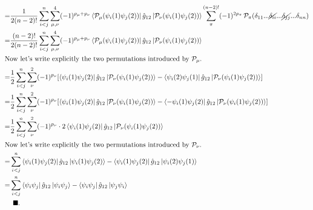 \documentclass{article}
\newcommand{\vsp}{\vspace{0.2cm}}
\newcommand{\suml}{\sum\limits}
\newcommand{\no}{\cancel}
\renewcommand{\qed}{\ensuremath{\vsp \\ &\hspace{0.15cm} \blacksquare. \\}}
\newcommand{\pmt}{\ensuremath{\mathcal{P}}}
\begin{document}
\begin{align*}
=& 
   \frac{1}{2(n-2)!} 
   \suml_{i<j}^n 
   \suml_{\mu,\nu}^{4} 
   (-1)^{p_{\mu}+p_{\nu}}
   \Bra{\pmt_{\mu}(\psi_i(1)\psi_j(2))} 
      \hat{g}_{12}
   \Ket{ \pmt_{\nu} (\psi_i(1)\psi_j(2))} \suml^{(n-2)!}_{\pi}  (-1)^{2p_{\pi}} \, \pmt_{\pi} ( \delta_{11} ... \no{\delta_{ii}}...\no{\delta_{jj}} ... \delta_{nn} ) \\
=& \frac{(n-2)!}{2(n-2)!}  \suml_{i<j}^n \suml_{\mu,\nu}^{4} (-1)^{p_{\mu}+p_{\nu}}\Bra{\pmt_{\mu}(\psi_i(1)\psi_j(2))} \hat{g}_{12}\Ket{ \pmt_{\nu} (\psi_i(1)\psi_j(2))} \\
\intertext{Now let's write explicitly the two permutations introduced by $\pmt_{\mu}$.}
=& 
   \frac{1}{2}  
   \suml_{i<j}^n 
   \suml_{\nu}^{2} 
   (-1)^{p_{\nu}} 
   [\Bra{\psi_i(1)\psi_j(2)} 
      \hat{g}_{12}
   \Ket{ \pmt_{\nu} (\psi_i(1)\psi_j(2))} 
   -  
   \Bra{\psi_i(2)\psi_j(1)} 
      \hat{g}_{12}
   \Ket{ \pmt_{\nu} (\psi_i(1)\psi_j(2))}]
\\
=& 
    \frac{1}{2}  
    \suml_{i<j}^n 
    \suml_{\nu}^{2} (-1)^{p_{\nu}} 
    [
       \Bra{\psi_i(1)\psi_j(2)} 
          \hat{g}_{12}
       \Ket{ \pmt_{\nu} (\psi_i(1)\psi_j(2))} 
    - 
       \Bra{-\psi_i(1)\psi_j(2)} 
          \hat{g}_{12}
       \Ket{ \pmt_{\nu} (\psi_i(1)\psi_j(2))}]
\\
=& 
   \frac{1}{2}  
   \suml_{i<j}^n 
   \suml_{\nu}^{2} 
   (-1)^{p_{\nu}} 
\cdot 
   2 \Bra{\psi_i(1)\psi_j(2)} 
      \hat{g}_{12}
   \Ket{ \pmt_{\nu}  (\psi_i(1)\psi_j(2))} \\
\intertext{Now let's write explicitly the two permutations introduced by $\pmt_{\nu}$.}
=&  
   \suml_{i<j}^n 
   \Bra{\psi_i(1)\psi_j(2)} 
      \hat{g}_{12}
   \Ket{\psi_i(1)\psi_j(2)} 
-  
   \Bra{\psi_i(1)\psi_j(2)} 
      \hat{g}_{12}
   \Ket{\psi_i(2)\psi_j(1)} \\
=&  
   \suml_{i<j}^n 
   \Bra{\psi_i\psi_j} 
      \hat{g}_{12}
   \Ket{\psi_i\psi_j} 
-  
   \Bra{\psi_i\psi_j} 
      \hat{g}_{12}
   \Ket{\psi_j \psi_i} 
\qed 
\end{align*}
\newpage

\end{document}
